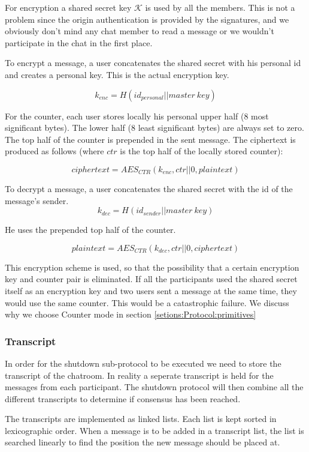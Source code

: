 For encryption a shared secret key $\mathcal{K}$ is used by all the members. This is not a problem since the origin authentication is provided by the signatures, and we obviously don't mind any chat member to read a message or we wouldn't participate in the chat in the first place.

To encrypt a message, a user concatenates the shared secret with his personal id and creates a personal key.
This is the actual encryption key.

\[
k_{enc} = H(id_{personal} || master\ key)
\]

For the counter, each user stores locally his personal upper half (8 most significant bytes).
The lower half (8 least significant bytes) are always set to zero.
The top half of the counter is prepended in the sent message.
The ciphertext is produced as follows (where $ctr$ is the top half of the locally stored counter):

\[
ciphertext = AES_{CTR}(k_{enc}, ctr||0, plaintext)
\]

To decrypt a message, a user concatenates the shared secret with the id of the message's sender.
\[
k_{dec} = H(id_{sender} || master\ key)
\]

He uses the prepended top half of the counter.

\[
plaintext = AES_{CTR}(k_{dec}, ctr||0, ciphertext)
\]

This encryption scheme is used, so that the possibility that a certain encryption key and counter pair is eliminated.
If all the participants used the shared secret itself as an encryption key and two users sent a message at the same time, they would use the same counter.
This would be a catastrophic failure.
We discuss why we choose Counter mode in section \ref{setions:Protocol:primitives}

\subsubsection{Transcript}
In order for the shutdown sub-protocol to be executed we need to store the transcript of the chatroom. In reality a seperate transcript is held for the messages from each participant.
The shutdown protocol will then combine all the different transcripts to determine if consensus has been reached.

The transcripts are implemented as linked lists. Each list is kept sorted in lexicographic order.
When a message is to be added in a transcript list, the list is searched linearly to find the position the new message should be placed at.


